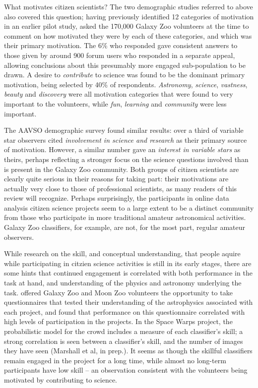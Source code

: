 \documentclass{ar2e}
\begin{document}
What motivates citizen scientists? The two demographic studies referred to above
also covered this question; having previously \citep{Rad++2010} identified 12
categories of motivation in an earlier pilot study, \citet{Rad++2013} asked the
170,000 Galaxy Zoo volunteers at the time to comment on how motivated they were
by each of these categories, and which was their primary motivation. The 6\% who
responded gave consistent answers to those given by around 900 forum users who
responded in a separate appeal, allowing conclusions about this presumably more
engaged sub-population to be drawn. A desire to {\it contribute} to science was
found to be the dominant primary motivation, being selected by 40\% of
respondents. {\it Astronomy}, {\it science}, {\it vastness}, {\it beauty} and 
{\it discovery} were all motivation categories that were found to very important
to the volunteers, while {\it fun}, {\it learning} and {\it community} were less
important. 

The AAVSO demographic survey \citep{P+P2012} found similar results: over a third
of variable star observers cited {\it involvement in science and research} as
their primary source of motivation. However, a similar number gave an {\it
interest in variable stars} as theirs, perhaps reflecting a stronger focus on
the science questions involved than is present in the Galaxy Zoo community. Both
groups of citizen scientists are clearly quite serious in their reasons for
taking part: their motivations are actually very close to those of professional
scientists, as many readers of this review will recognize. Perhaps surprisingly,
the participants in online data analysis citizen science projects seem to a
large extent to be a distinct community from those who participate in more
traditional amateur astronomical activities. Galaxy Zoo classifiers, for
example, are not, for the most part, regular amateur observers. 

While research on the skill, and conceptual understanding, that  people aquire
while participating in citzien science activities is still in its early stages,
there are some hints that continued engagement is correlated with both
performance in the task at hand, and understanding of the physics and astronomy
underlying the task. \citet{Prather++2013} offered Galaxy Zoo and Moon Zoo
volunteers the opportunity to take questionnaires that tested their
understanding of the astrophysics associated with each project, and found that
performance on this questionnaire correlated with high levels of participation
in the projects. In the Space Warps project, the probabilistic model for the
crowd includes a measure of each classifier's skill; a strong correlation is
seen between a classifier's skill, and the number of images they have seen
(Marshall et al, in prep.). It seems as though the skillful classifiers remain
engaged in the project for a long time, while almost no long-term participants
have low skill -- an observation consistent with the volunteers being motivated
by contributing to science.
\end{document}
